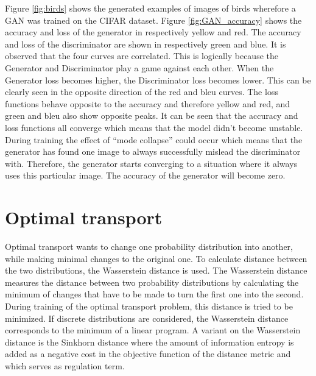 \documentclass[a4paper,10pt]{article}
\begin{document}
Figure \ref{fig:birds} shows the generated examples of images of birds wherefore a GAN was trained on the CIFAR dataset. Figure \ref{fig:GAN_accuracy} shows the accuracy and loss of the generator in respectively yellow and red. The accuracy and loss of the discriminator are shown in respectively green and blue. It is observed that the four curves are correlated. This is logically because the Generator and Discriminator play a game against each other. When the Generator loss becomes higher, the Discriminator loss becomes lower. This can be clearly seen in the opposite direction of the red and bleu curves. The loss functions behave opposite to the accuracy and therefore yellow and red, and green and bleu also show opposite peaks. It can be seen that the accuracy and loss functions all converge which means that the model didn't become unstable. During training the effect of ``mode collapse'' could occur which means that the generator has found one image to always successfully mislead the discriminator with. Therefore, the generator starts converging to a situation where it always uses this particular image. The accuracy of the generator will become zero. 


\section{Optimal transport}
Optimal transport wants to change one probability distribution into another, while making minimal changes to the original one. To calculate distance between the two distributions, the Wasserstein distance is used. The Wasserstein distance measures the distance between two probability distributions by calculating the minimum of changes that have to be made to turn the first one into the second. 
During training of the optimal transport problem, this distance is tried to be minimized. If discrete distributions are considered, the Wasserstein  distance corresponds to the minimum of a linear program. A variant on the Wasserstein distance is the Sinkhorn distance where the amount of information entropy is added as a negative cost in the objective function of the distance metric and which serves as regulation term.
\end{document}
